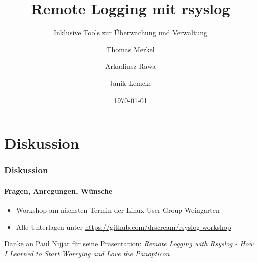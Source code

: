 \documentclass[12pt,a4paper]{beamer}
\title{Remote Logging mit rsyslog}
\subtitle{Inklusive Tools zur Überwachung und Verwaltung}
\author{Thomas Merkel \and Arkadiusz Rawa \and Janik Lemcke}
\institute{Hochschule Ravensburg-Weingarten}
\date{\today}
\begin{document}
	\begin{frame}
		\titlepage
	\end{frame} 
	\begin{frame}
		\tableofcontents
	\end{frame}
	
	
	
	
	

	\section{Diskussion}
	\begin{frame}
		\frametitle{Diskussion}
		\framesubtitle{Fragen, Anregungen, Wünsche}
		\begin{itemize}
			\item Workshop am nächsten Termin der Linux User Group Weingarten
			\item Alle Unterlagen unter \url{https://github.com/drscream/rsyslog-workshop}
		\end{itemize}
		\bigskip
		\bigskip
		\scriptsize{
			Danke an Paul Nijjar für seine Präsentation: \linebreak 
			\textit{Remote Logging with Rsyslog - How I Learned to Start Worrying and Love the Panopticon}
		}
	\end{frame}
\end{document}
